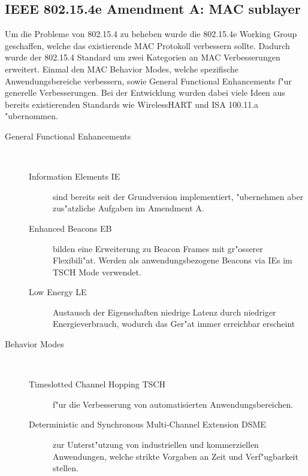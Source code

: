 \subsection{IEEE 802.15.4e Amendment A: MAC sublayer} \label{Kap5-3}

Um die Probleme von 802.15.4 zu beheben wurde die 802.15.4e Working Group geschaffen,
welche das existierende MAC Protokoll verbessern sollte. Dadurch wurde
der 802.15.4 Standard um zwei Kategorien an MAC Verbesserungen erweitert.
Einmal den MAC Behavior Modes, welche spezifische Anwendungsbereiche verbessern,
sowie General Functional Enhancements f"ur generelle Verbesserungen. Bei der Entwicklung
wurden dabei viele Ideen aus bereits existierenden Standards wie WirelessHART und
ISA 100.11.a "ubernommen.

\begin{description}

\item[General Functional Enhancements] \hfill \\
  \begin{description}
    \item[Information Elements IE] sind bereits seit der Grundversion implementiert,
    "ubernehmen aber zus"atzliche Aufgaben im Amendment A.
    \item[Enhanced Beacons EB] bilden eine Erweiterung zu Beacon Frames mit gr"osserer
    Flexibili"at. Werden als anwendungsbezogene Beacons via IEs im TSCH Mode verwendet.

    \item[Low Energy LE] Austausch der Eigenschaften niedrige Latenz durch
    niedriger Energieverbrauch, wodurch das Ger"at immer erreichbar erscheint
  \end{description}

  \item[Behavior Modes] \hfill \\

    \begin{description}
      \item[Timeslotted Channel Hopping TSCH] f"ur die Verbesserung von automatisierten
      Anwendungsbereichen.
      \item[Deterministic and Synchronous Multi-Channel Extension DSME] zur Unterst"utzung
      von industriellen und kommerziellen Anwendungen, welche strikte Vorgaben
      an Zeit und Verf"ugbarkeit stellen.
    \end{description}
\end{description}
